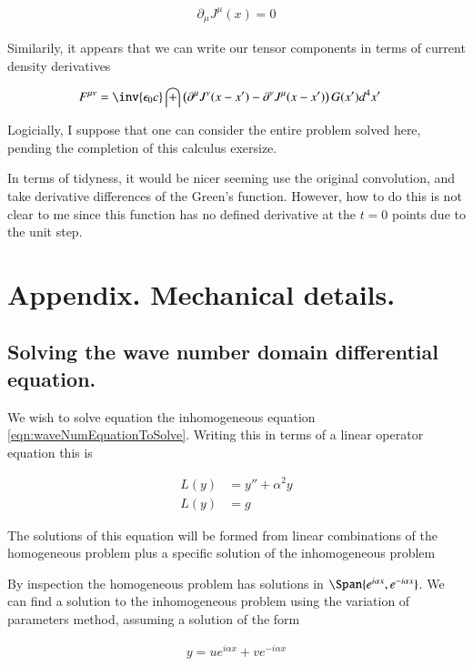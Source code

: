 \documentclass{article}
\begin{document}
\begin{align*}
\partial_\mu J^\mu(x) = 0
\end{align*}

Similarily, it appears that we can write our tensor components in terms of current density derivatives

\begin{align}
F^{\mu\nu} 
&= \inv{\epsilon_0 c} \int \left(\partial^\mu J^\nu(x - x') - \partial^\nu J^\mu(x - x') \right) G(x') d^4 x'
\end{align}

Logicially, I suppose that one can consider the entire problem solved here, pending the completion of this calculus exersize.

In terms of tidyness, it would be nicer seeming use the original convolution, and take derivative differences of the Green's
function.  However, how to do this is not clear to me since this function has no defined derivative
at the $t=0$ points due to the unit step.

\section{ Appendix.  Mechanical details. }

\subsection{ Solving the wave number domain differential equation. }

We wish to solve equation the inhomogeneous equation \ref{eqn:waveNumEquationToSolve}.  Writing this in terms of a linear operator equation this is

\begin{align*}
L(y) &= y'' + \alpha^2 y \\
L(y) &= g
\end{align*}

The solutions of this equation will be formed from linear combinations of the homogeneous problem plus a specific solution of the inhomogeneous problem

By inspection the homogeneous problem has solutions in $\Span \{ e^{ i \alpha x }, e^{ -i \alpha x }\}$.
We can find a solution to the inhomogeneous problem using the variation of parameters method, assuming a solution of the form

\begin{align*}
y  = u e^{ i \alpha x } + v e^{ -i \alpha x }
\end{align*}
\end{document}
